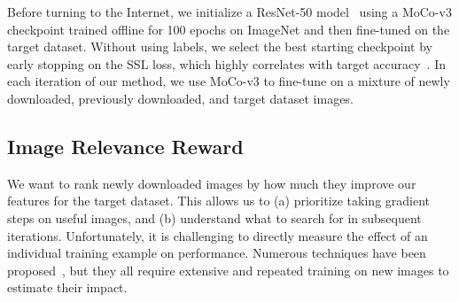Before turning to the Internet, we initialize a ResNet-50 model~\cite{he2016deep} using a MoCo-v3 checkpoint trained offline for 100 epochs on ImageNet and then fine-tuned on the target dataset. Without using labels, we select the best starting checkpoint by early stopping on the SSL loss, which highly correlates with target accuracy~\cite{li2022understanding}.
In each iteration of our method, we use MoCo-v3 to fine-tune on a mixture of newly downloaded, previously downloaded, and target dataset images.



\subsection{Image Relevance Reward}
\label{subsec:image_rel_reward}
We want to rank newly downloaded images by how much they improve our features for the target dataset. This allows us to (a) prioritize taking gradient steps on useful images, and (b) understand what to search for in subsequent iterations. Unfortunately, it is challenging to directly measure the effect of an individual training example on performance. Numerous techniques have been proposed~\cite{koh2017understanding,feldman2020neural,paul2021deep,ilyas2022datamodels}, but they all require extensive and repeated training on new images to estimate their impact. 

